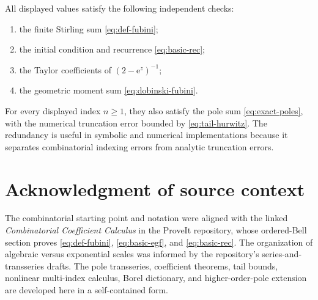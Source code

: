 \documentclass[11pt,a4paper]{article}
\theoremstyle{definition}
\theoremstyle{remark}
\newcommand{\e}{\mathrm e}
\begin{document}
All displayed values satisfy the following independent checks:
\begin{enumerate}
\item the finite Stirling sum \eqref{eq:def-fubini};
\item the initial condition and recurrence \eqref{eq:basic-rec};
\item the Taylor coefficients of \((2-\e^z)^{-1}\);
\item the geometric moment sum \eqref{eq:dobinski-fubini}.
\end{enumerate}
For every displayed index \(n\ge1\), they also satisfy the pole sum
\eqref{eq:exact-poles}, with the numerical truncation error bounded by
\eqref{eq:tail-hurwitz}.
The redundancy is useful in symbolic and numerical implementations because it
separates combinatorial indexing errors from analytic truncation errors.

\section*{Acknowledgment of source context}
The combinatorial starting point and notation were aligned with the linked
\emph{Combinatorial Coefficient Calculus} in the ProveIt repository, whose
ordered-Bell section proves \eqref{eq:def-fubini}, \eqref{eq:basic-egf}, and
\eqref{eq:basic-rec}.  The organization of algebraic versus exponential scales
was informed by the repository's series-and-transseries drafts.  The pole
transseries, coefficient theorems, tail bounds, nonlinear multi-index calculus,
Borel dictionary, and higher-order-pole extension are developed here in a
self-contained form.
\end{document}
